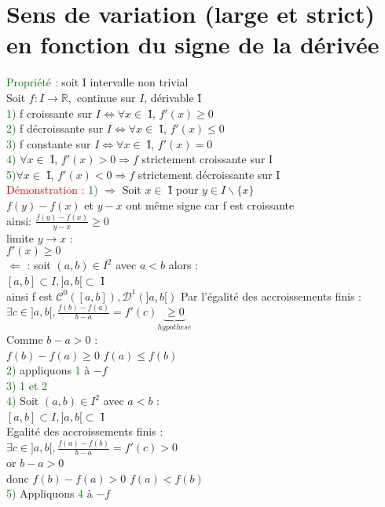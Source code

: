 \documentclass{article}
\begin{document}
\section{Sens de variation (large et strict) en fonction du signe de la dérivée}
\textcolor{green}{Propriété :} soit I intervalle non trivial \\  Soit $f:I \rightarrow \mathbb{R},$ continue sur $I$, dérivable \r{I} \\
\textcolor{green}{1)} f croissante sur $I \Leftrightarrow \forall x \in $ \r{I}, $f'(x) \geq 0$ \\ 
\textcolor{green}{2)} f décroissante sur $I \Leftrightarrow \forall x \in $ \r{I}, $f'(x) \leq 0$ \\ 
\textcolor{green}{3)} f constante sur $I \Leftrightarrow \forall x \in $ \r{I}, $f'(x) = 0$ \\ 
\textcolor{green}{4)}  $\forall x \in $ \r{I}, $f'(x) > 0 \Rightarrow f$ strictement croissante sur I \\ 
\textcolor{green}{5)}$\forall x \in $ \r{I}, $f'(x) < 0 \Rightarrow f$ strictement décroissante sur I \\ 
\textcolor{red}{Démonstration :} \textcolor{green}{1)} $\Rightarrow$ Soit $x \in $ \r{I} pour $y \in I \backslash \lbrace x \rbrace$ \\ 
$f(y)-f(x)$ et $y-x$ ont même signe car f est croissante\\
ainsi: $\frac{f(y)-f(x)}{y-x}\geq 0$\\ 
limite $ y \rightarrow x$ : \\ 
$f'(x) \geq 0$ \\ 
$\Leftarrow$ : soit $(a,b) \in I^2$ avec $a<b$ alors : \\ 
$[a,b] \subset I, ]a,b[ \subset $ \r{I} \\ 
ainsi f est $\mathcal{C}^0([a,b]), \mathcal{D}^1(]a,b[)$
Par l'égalité des accroissements finis : \\ 
$\exists c \in ]a,b[, \frac{f(b)-f(a)}{b-a}=f'(c) \underbrace{\geq 0}_{hypothese}$ \\ 
Comme $b-a> 0$ : \\ 
$f(b)-f(a) \geq 0$
$f(a) \leq f(b)$ \\ 
\textcolor{green}{2)} appliquons \textcolor{green}{1} à $-f$ \\ 
\textcolor{green}{3) 1 et 2} \\
\textcolor{green}{4)} Soit $(a,b) \in I^2$ avec $a < b$ : \\ 
$[a,b] \subset I, ]a,b[ \subset$ \r{I} \\ 
Egalité des accroissements finis : \\ 
$\exists c \in ]a,b[, \frac{f(a)-f(b)}{b-a}=f'(c)>0$ \\ 
or $b-a > 0$ \\ 
donc $f(b)-f(a)>0$ $f(a) <f(b)$ \\ 
\textcolor{green}{5)} Appliquons \textcolor{green}{4} à $-f$
\end{document}
